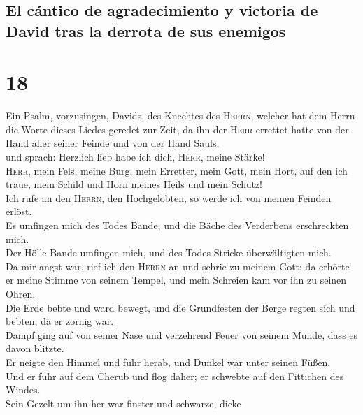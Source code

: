\hypertarget{el-cuxe1ntico-de-agradecimiento-y-victoria-de-david-tras-la-derrota-de-sus-enemigos}{%
\subsection{El cántico de agradecimiento y victoria de David tras la
derrota de sus
enemigos}\label{el-cuxe1ntico-de-agradecimiento-y-victoria-de-david-tras-la-derrota-de-sus-enemigos}}

\hypertarget{section-17}{%
\section{18}\label{section-17}}

 Ein Psalm, vorzusingen, Davids, des Knechtes des
\textsc{Herrn}, welcher hat dem Herrn die Worte dieses Liedes geredet
zur Zeit, da ihn der \textsc{Herr} errettet hatte von der Hand aller
seiner Feinde und von der Hand Sauls,\\
 und sprach: Herzlich lieb habe ich dich, \textsc{Herr},
meine Stärke!\\
 \textsc{Herr}, mein Fels, meine Burg, mein Erretter, mein
Gott, mein Hort, auf den ich traue, mein Schild und Horn meines Heils
und mein Schutz!\\
 Ich rufe an den \textsc{Herrn}, den Hochgelobten, so
werde ich von meinen Feinden erlöst.\\
 Es umfingen mich des Todes Bande, und die Bäche des
Verderbens erschreckten mich.\\
 Der Hölle Bande umfingen mich, und des Todes Stricke
überwältigten mich.\\
 Da mir angst war, rief ich den \textsc{Herrn} an und
schrie zu meinem Gott; da erhörte er meine Stimme von seinem Tempel, und
mein Schreien kam vor ihn zu seinen Ohren.\\
 Die Erde bebte und ward bewegt, und die Grundfesten der
Berge regten sich und bebten, da er zornig war.\\
 Dampf ging auf von seiner Nase und verzehrend Feuer von
seinem Munde, dass es davon blitzte.\\
 Er neigte den Himmel und fuhr herab, und Dunkel war
unter seinen Füßen.\\
 Und er fuhr auf dem Cherub und flog daher; er schwebte
auf den Fittichen des Windes.\\
 Sein Gezelt um ihn her war finster und schwarze, dicke
